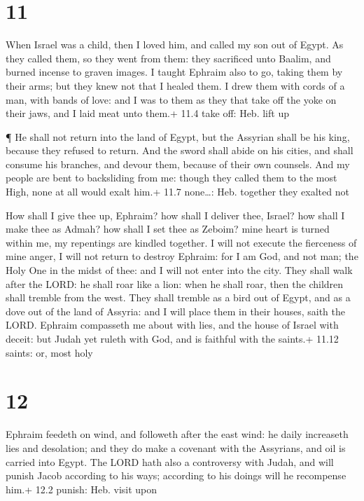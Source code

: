 \hypertarget{section-10}{%
\section{11}\label{section-10}}

 When Israel was a child, then I loved him, and called my
son out of Egypt.  As they called them, so they went from
them: they sacrificed unto Baalim, and burned incense to graven images.
 I taught Ephraim also to go, taking them by their arms; but
they knew not that I healed them.  I drew them with cords of
a man, with bands of love: and I was to them as they that take off the
yoke on their jaws, and I laid meat unto them.+ 11.4 take off: Heb. lift
up

 ¶ He shall not return into the land of Egypt, but the
Assyrian shall be his king, because they refused to return. 
And the sword shall abide on his cities, and shall consume his branches,
and devour them, because of their own counsels.  And my
people are bent to backsliding from me: though they called them to the
most High, none at all would exalt him.+ 11.7 none\ldots: Heb. together
they exalted not

 How shall I give thee up, Ephraim? how shall I deliver
thee, Israel? how shall I make thee as Admah? how shall I set thee as
Zeboim? mine heart is turned within me, my repentings are kindled
together.  I will not execute the fierceness of mine anger,
I will not return to destroy Ephraim: for I am God, and not man; the
Holy One in the midst of thee: and I will not enter into the city.
 They shall walk after the LORD: he shall roar like a lion:
when he shall roar, then the children shall tremble from the west.
 They shall tremble as a bird out of Egypt, and as a dove
out of the land of Assyria: and I will place them in their houses, saith
the LORD.  Ephraim compasseth me about with lies, and the
house of Israel with deceit: but Judah yet ruleth with God, and is
faithful with the saints.+ 11.12 saints: or, most holy

\hypertarget{section-11}{%
\section{12}\label{section-11}}

 Ephraim feedeth on wind, and followeth after the east wind:
he daily increaseth lies and desolation; and they do make a covenant
with the Assyrians, and oil is carried into Egypt.  The LORD
hath also a controversy with Judah, and will punish Jacob according to
his ways; according to his doings will he recompense him.+ 12.2 punish:
Heb. visit upon

